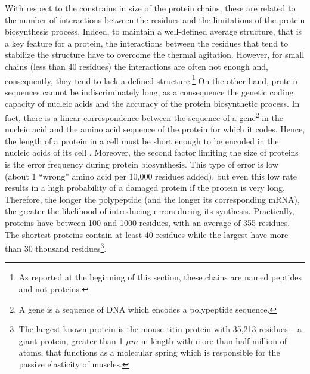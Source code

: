 With respect to the constrains in size of the protein chains, these are related to the number of interactions between the residues and the limitations of the protein biosynthesis process.
Indeed, to maintain a well-defined average structure, that is a key feature for a protein, the interactions between the residues that tend to stabilize the structure have to overcome the thermal agitation. However, for small chains (less than 40 residues) the interactions are often not enough and, consequently, they tend to lack a defined structure.\footnote{As reported at the beginning of this section, these chains are named peptides and not proteins.}%
On the other hand, protein sequences cannot be indiscriminately long, as a consequence the genetic coding capacity of nucleic acids and the accuracy of the protein biosynthetic process. In fact, there is a linear correspondence between the sequence of a gene\footnote{A gene is a sequence of DNA which encodes a polypeptide sequence.} in the nucleic acid and the amino acid sequence of the protein for which it codes. Hence, the length of a protein in a cell must be short enough to be encoded in the nucleic acids of its cell \cite{nelson2008lehninger}. Moreover, the second factor limiting the size of proteins is the error frequency during protein biosynthesis. This type of error is low (about 1 ``wrong'' amino acid per 10,000 residues added), but even this low rate results in a high probability of a damaged protein if the protein is very long. Therefore, the longer the polypeptide (and the longer its corresponding mRNA), the greater the likelihood of introducing errors during its synthesis. 
Practically, proteins have between 100 and 1000 residues, with an average of 355 residues. The shortest proteins contain at least 40 residues while the largest have more than 30 thousand residues\footnote{The largest known protein is the mouse titin protein with 35,213-residues -- a giant protein, greater than 1 $\mu m$ in length with more than half million of atoms, that functions as a molecular spring which is responsible for the passive elasticity of muscles.}.

